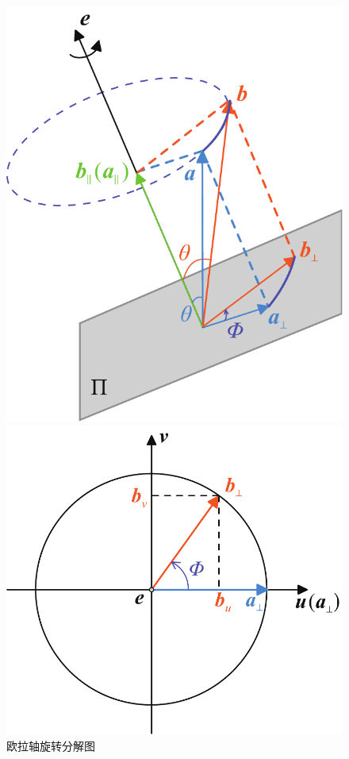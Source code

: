 \begin{figure}[!htb]
	\begin{minipage}{0.31\linewidth}
		\centering
		\includegraphics[width=0.9\linewidth]{pic/欧拉轴}
		\vspace*{-1.2em}
		\caption{欧拉轴旋转分解图}
		\label{欧拉轴}
	\end{minipage}
	\begin{minipage}{0.348\linewidth}
		\centering
		\includegraphics[width=\linewidth]{pic/欧拉轴2}

\end{minipage}
\end{figure}
